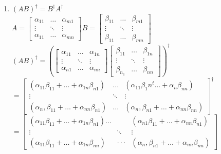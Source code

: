 \documentclass[12pt]{article}
\theoremstyle{plain}
\theoremstyle{nonumberplain}
\theoremstyle{plain}
\theoremstyle{nonumberplain}
\newcommand\1{{\bf 1}}
\newcommand{\<}{\left\langle}
\renewcommand{\>}{\right\rangle}
\begin{document}
\begin{enumerate}[label=(\alph*)]
\item $(AB)^\dagger=B^\dagger A^\dagger$ \\
$A=\begin{bmatrix}
\alpha _{11} & \ldots  & \alpha _{m1} \\
\vdots & \ddots  & \vdots  \\
\alpha _{11} & \ldots  & \alpha _{mn}
\end{bmatrix}B=\begin{bmatrix}
\beta _{11} & \ldots  & \beta _{m1} \\
\vdots  & \ddots  & \vdots \\
\beta _{11} & \ldots  & \beta _{mn}
\end{bmatrix}$\\
$\left( AB\right) ^{\dagger}=\left( \begin{bmatrix}
\alpha _{11} & \ldots  & \alpha _{1n} \\
\vdots  & \ddots  & \vdots  \\
\alpha _{n1} & \ldots  & \alpha _{nn}
\end{bmatrix}\begin{bmatrix}
\beta _{11} & \ldots  & \beta _{1n} \\
\vdots  & \ddots  & \vdots  \\
\beta _{n_{1}} & \ldots  & \beta _{nn}
\end{bmatrix}\right) ^{\dagger}$\\$= \begin{bmatrix}
\left( \alpha _{11}\beta _{11}+\ldots +\alpha _{1n}\beta _{n1}\right)  & \ldots  & \left( \alpha _{11}\beta _{1}n^{t}\ldots +\alpha_{n}\beta_{nn}\right)  \\
\vdots  & \ddots  & \vdots  \\
\left( \alpha_{n},\beta _{11}+\ldots +\alpha _{nn}\beta _{n1}\right)  & \ldots  & \left( \alpha _{n},\beta _{n1}+\ldots +\alpha _{nn}\beta _{nn}\right) 
\end{bmatrix}^\dagger$\\$=\begin{bmatrix}
\left( \alpha _{11}\beta _{11}+\ldots +\alpha _{1n}\beta _{n1}\right) \ldots  &  & \left( \alpha_{n1}\beta _{11}+\ldots +\alpha _{nn}\beta _{n1}\right)  \\
\vdots  & \ddots  & \vdots  \\
\left( \alpha _{11}\beta _{11}+\ldots +\alpha _{1n}\beta _{nn}\right)  & \cdot \cdot \cdot  & \left( \alpha _{n},\beta _{n1}+\ldots +\alpha _{nn}\beta _{nn}\right) 
\end{bmatrix}$\\

\end{enumerate}
\end{document}
